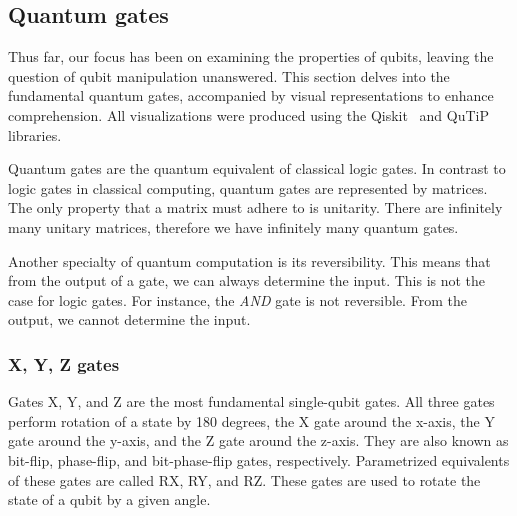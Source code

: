 \tocless\subsection{Quantum gates}\noindent
Thus far, our focus has been on examining the properties of qubits, leaving the question of qubit manipulation unanswered. This section delves into the fundamental quantum gates, accompanied by visual representations to enhance comprehension. All visualizations were produced using the Qiskit~\cite{qiskit} and QuTiP~\cite{qutip} libraries.

Quantum gates are the quantum equivalent of classical logic gates. In contrast to logic gates in classical computing, quantum gates are represented by matrices. The only property that a matrix must adhere to is unitarity. There are infinitely many unitary matrices, therefore we have infinitely many quantum gates.

Another specialty of quantum computation is its reversibility. This means that from the output of a gate, we can always determine the input. This is not the case for logic gates. For instance, the \textit{AND} gate is not reversible. From the output, we cannot determine the input.

\subsubsection{X, Y, Z gates}
Gates X, Y, and Z are the most fundamental single-qubit gates. All three gates perform rotation of a state by 180 degrees, the X gate around the x-axis, the Y gate around the y-axis, and the Z gate around the z-axis. They are also known as bit-flip, phase-flip, and bit-phase-flip gates, respectively. Parametrized equivalents of these gates are called RX, RY, and RZ. These gates are used to rotate the state of a qubit by a given angle.

